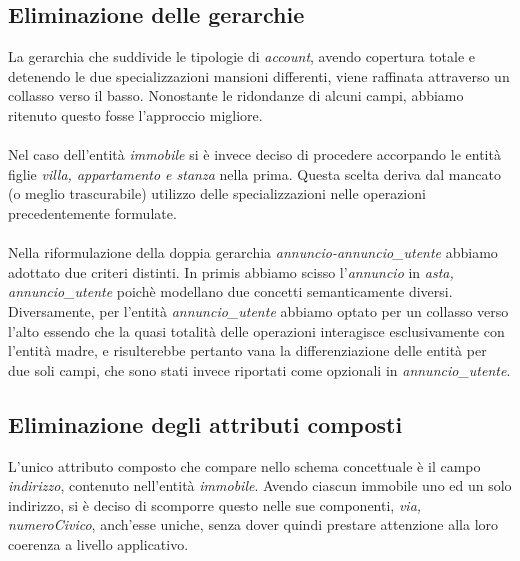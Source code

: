 \documentclass[a4paper,12pt]{report}
\begin{document}
            \subsection*{Eliminazione delle gerarchie}
                La gerarchia che suddivide le tipologie di \textit{account}, avendo copertura totale e
                detenendo le due specializzazioni mansioni differenti, viene raffinata
                attraverso un collasso verso il basso. Nonostante le ridondanze di alcuni campi,
                abbiamo ritenuto questo fosse l'approccio migliore.\\
                \\
                Nel caso dell'entità \textit{immobile} si è invece deciso di procedere accorpando le
                entità figlie \textit{villa, appartamento e stanza} nella prima. Questa scelta deriva
                dal mancato (o meglio trascurabile) utilizzo delle specializzazioni nelle operazioni
                precedentemente formulate.\\
                \\
                Nella riformulazione della doppia gerarchia \textit{annuncio-annuncio\_utente} abbiamo
                adottato due criteri distinti. In primis abbiamo scisso l'\textit{annuncio} in 
                \textit{asta, annuncio\_utente} poichè modellano due concetti semanticamente diversi.
                Diversamente, per l'entità \textit{annuncio\_utente} abbiamo optato per un collasso verso
                l'alto essendo che la quasi totalità delle operazioni interagisce esclusivamente con l'entità 
                madre, e risulterebbe pertanto vana la differenziazione delle entità per due soli campi, che 
                sono stati invece riportati come opzionali in \textit{annuncio\_utente}.


            \subsection*{Eliminazione degli attributi composti}
            L'unico attributo composto che compare nello schema concettuale è il campo \textit{indirizzo},
            contenuto nell'entità \textit{immobile}. Avendo ciascun immobile uno ed un solo indirizzo,
            si è deciso di scomporre questo nelle sue componenti, \textit{via, numeroCivico}, anch'esse uniche, senza dover quindi 
            prestare attenzione alla loro coerenza a livello applicativo.
\end{document}
